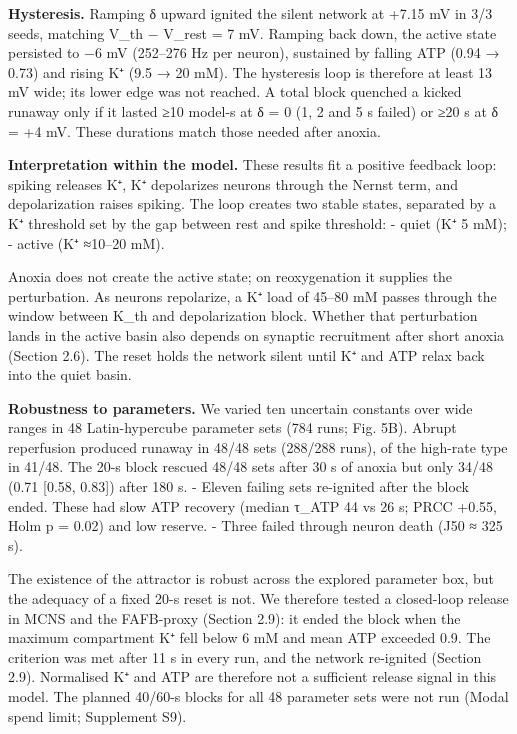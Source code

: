 \documentclass[11pt]{article}
\begin{document}
\textbf{Hysteresis.} Ramping δ upward ignited the silent network at +7.15 mV in 3/3 seeds, matching V\_th − V\_rest = 7 mV. Ramping back down, the active state persisted to −6 mV (252--276 Hz per neuron), sustained by falling ATP (0.94 → 0.73) and rising K⁺ (9.5 → 20 mM). The hysteresis loop is therefore at least 13 mV wide; its lower edge was not reached. A total block quenched a kicked runaway only if it lasted ≥10 model-s at δ = 0 (1, 2 and 5 s failed) or ≥20 s at δ = +4 mV. These durations match those needed after anoxia.

\textbf{Interpretation within the model.} These results fit a positive feedback loop: spiking releases K⁺, K⁺ depolarizes neurons through the Nernst term, and depolarization raises spiking. The loop creates two stable states, separated by a K⁺ threshold set by the gap between rest and spike threshold:
- quiet (K⁺ 5 mM);
- active (K⁺ ≈10--20 mM).

Anoxia does not create the active state; on reoxygenation it supplies the perturbation. As neurons repolarize, a K⁺ load of 45--80 mM passes through the window between K\_th and depolarization block. Whether that perturbation lands in the active basin also depends on synaptic recruitment after short anoxia (Section 2.6). The reset holds the network silent until K⁺ and ATP relax back into the quiet basin.

\textbf{Robustness to parameters.} We varied ten uncertain constants over wide ranges in 48 Latin-hypercube parameter sets (784 runs; Fig. 5B). Abrupt reperfusion produced runaway in 48/48 sets (288/288 runs), of the high-rate type in 41/48. The 20-s block rescued 48/48 sets after 30 s of anoxia but only 34/48 (0.71 {[}0.58, 0.83{]}) after 180 s.
- Eleven failing sets re-ignited after the block ended. These had slow ATP recovery (median τ\_ATP 44 vs 26 s; PRCC +0.55, Holm p = 0.02) and low reserve.
- Three failed through neuron death (J50 ≈ 325 s).

The existence of the attractor is robust across the explored parameter box, but the adequacy of a fixed 20-s reset is not. We therefore tested a closed-loop release in MCNS and the FAFB-proxy (Section 2.9): it ended the block when the maximum compartment K⁺ fell below 6 mM and mean ATP exceeded 0.9. The criterion was met after 11 s in every run, and the network re-ignited (Section 2.9). Normalised K⁺ and ATP are therefore not a sufficient release signal in this model. The planned 40/60-s blocks for all 48 parameter sets were not run (Modal spend limit; Supplement S9).
\end{document}
